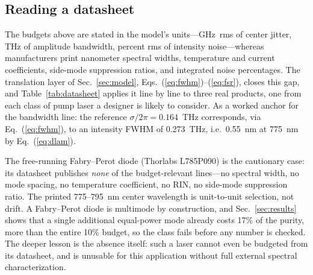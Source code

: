 \subsection*{Reading a datasheet}

The budgets above are stated in the model's units---GHz~rms of center
jitter, THz of amplitude bandwidth, percent rms of intensity
noise---whereas manufacturers print nanometer spectral widths,
temperature and current coefficients, side-mode suppression ratios,
and integrated noise percentages. The translation layer of
Sec.~\ref{sec:model}, Eqs.~(\ref{eq:fwhm})--(\ref{eq:fsr}), closes
this gap, and Table~\ref{tab:datasheet} applies it line by line to
three real products, one from each class of pump laser a designer is
likely to consider. As a worked anchor for the bandwidth line: the
reference $\sigma/2\pi = 0.164$~THz corresponds, via
Eq.~(\ref{eq:fwhm}), to an intensity FWHM of 0.273~THz, i.e.\ 0.55~nm
at 775~nm by Eq.~(\ref{eq:dlam}).

\begin{table}
\centering

\caption{Reading three real pump-laser datasheets against the
imperfection budgets. Each printed specification (first two columns)
is converted into the model's units (third column) with the
translation layer of Sec.~\ref{sec:model},
Eqs.~(\ref{eq:fwhm})--(\ref{eq:fsr}), and compared against the
Monte-Carlo budgets of Table~\ref{tab:budget} (last column). Lines the
manufacturers do not publish are marked as such---for the free-running
diode the omissions are themselves the finding. Sources are the public
datasheets cited in each block header.}
\label{tab:datasheet}
\end{table}

The free-running Fabry--Perot diode (Thorlabs L785P090) is the
cautionary case: its datasheet publishes \emph{none} of the
budget-relevant lines---no spectral width, no mode spacing, no
temperature coefficient, no RIN, no side-mode suppression ratio. The
printed 775--795~nm center wavelength is unit-to-unit selection, not
drift. A Fabry--Perot diode is multimode by construction, and
Sec.~\ref{sec:results} shows that a single additional equal-power
mode already costs 17\% of the purity, more than the entire 10\%
budget, so the class fails before any number is checked. The deeper
lesson is the absence itself: such a laser cannot even be budgeted
from its datasheet, and is unusable for this application without full
external spectral characterization.

